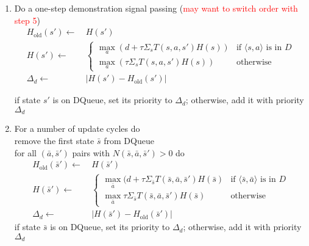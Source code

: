 \documentclass{article}
\begin{document}
\begin{enumerate}
\item Do a one-step demonstration signal passing (\textcolor{red}{may want to switch order with step 5})\\
\[
\begin{split}
H_{\text{old}}(s') \leftarrow\ & H(s')\\
H(s') \leftarrow\ & \begin{cases}
    \max_a (d + \tau \Sigma_s T(s,a,s') H(s))& \text{if \(\langle s,a \rangle\) is in $D$}\\
    \max_a (\tau \Sigma_s T(s,a,s') H(s))& \text{otherwise}
  \end{cases}\\
  \Delta_d \leftarrow\ & |H(s')-H_{\text{old}}(s')|
  \end{split}
\]

if state $s'$ is on DQueue, set its priority to $\Delta_d$; otherwise, add it with priority $\Delta_d$
\item For a number of update cycles do\\
remove the first state $\bar{s}$ from DQueue\\
for all $(\bar{a},\bar{s}')$ pairs with $N(\bar{s},\bar{a},\bar{s}')>0$ do
\[
\begin{split}
H_{\text{old}}(\bar{s}') \leftarrow\ & H(\bar{s}')\\
H(\bar{s}') \leftarrow\ & \begin{cases}
    \max_{\bar{a}} (d + \tau \Sigma_{\bar{s}} T(\bar{s},\bar{a},\bar{s}') H(\bar{s})& \text{if \(\langle \bar{s},\bar{a} \rangle\) is in $D$}\\
    \max_{\bar{a}} \tau \Sigma_{\bar{s}} T(\bar{s},\bar{a},\bar{s}') H(\bar{s})& \text{otherwise}
  \end{cases}\\
  \Delta_d \leftarrow\ & |H(\bar{s}')-H_{\text{old}}(\bar{s}')|
  \end{split}
\] 
if state $\bar{s}$ is on DQueue, set its priority to $\Delta_d$; otherwise, add it with priority $\Delta_d$




	
\end{enumerate}
\end{document}
